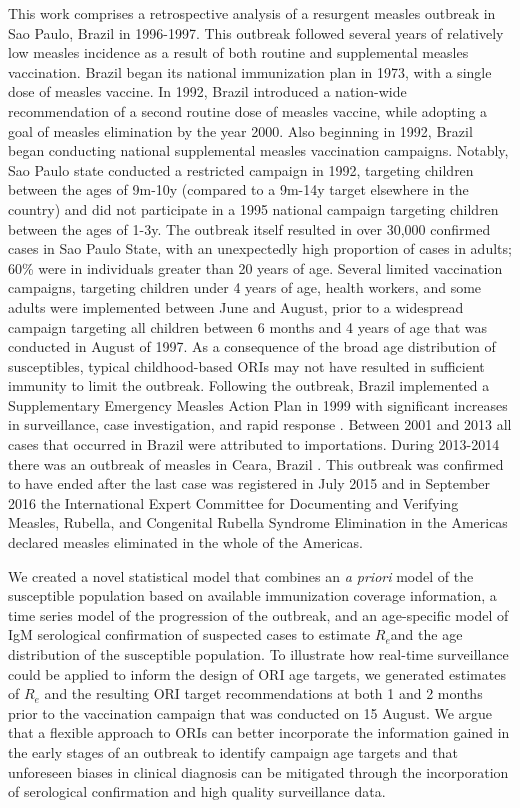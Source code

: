 This work comprises a retrospective analysis of a resurgent measles outbreak in Sao Paulo, Brazil in 1996-1997. This outbreak followed several years of relatively low measles incidence as a result of both routine and supplemental measles vaccination. Brazil began its national immunization plan in 1973, with a single dose of measles vaccine. In 1992, Brazil introduced a nation-wide recommendation of a second routine dose of measles vaccine, while adopting a goal of measles elimination by the year 2000.
Also beginning in 1992, Brazil began conducting national supplemental measles vaccination campaigns. Notably, Sao Paulo state conducted a restricted campaign in 1992, targeting children between the ages of 9m-10y (compared to a 9m-14y target elsewhere in the country) and did not participate in a 1995 national campaign targeting children between the ages of 1-3y. The outbreak itself resulted in over 30,000 confirmed cases in Sao Paulo State, with an unexpectedly high proportion of cases in adults; 60\% were in individuals greater than 20 years of age. Several limited vaccination campaigns, targeting children under 4 years of age, health workers, and some adults were implemented between June and August, prior to a widespread campaign targeting all children between 6 months and 4 years of age that was conducted in August of 1997. As a consequence of the broad age distribution of susceptibles, typical childhood-based ORIs may not have resulted in sufficient immunity to limit the outbreak. Following the outbreak, Brazil implemented a Supplementary Emergency Measles Action Plan in 1999 with significant increases in surveillance, case investigation, and rapid response \cite{Prevots_2003}. Between 2001 and 2013 all cases that occurred in Brazil were attributed to importations. During 2013-2014 there was an outbreak of measles in Ceara, Brazil \cite{Leite_2015}. This outbreak was confirmed to have ended after the last case was registered in July 2015 and in September 2016 the International Expert Committee for Documenting and Verifying Measles, Rubella, and Congenital Rubella Syndrome Elimination in the Americas declared measles eliminated in the whole of the Americas.

We created a novel statistical model that combines an \emph{a priori} model of the susceptible population based on available immunization coverage information, a time series model of the progression of the outbreak, and an age-specific model of IgM serological confirmation of suspected cases to estimate \(R_{e}\)and the age distribution of the susceptible population. To illustrate how real-time surveillance could be applied to inform the design of ORI age targets, we generated estimates of \(R_{e}\) and the resulting ORI target recommendations at both 1 and 2 months prior to the vaccination campaign that was conducted on 15 August. We argue that a flexible approach to ORIs can better incorporate the information gained in the early stages of an
outbreak to identify campaign age targets and that unforeseen biases in clinical diagnosis can be mitigated through the incorporation of serological confirmation and high quality surveillance data.